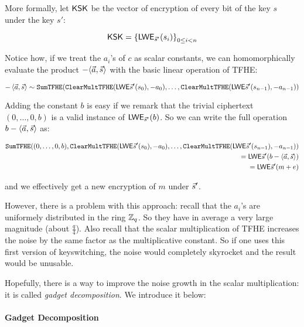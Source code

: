 More formally, let $\textsf{KSK}$ be the vector of encryption of every bit of the key $s$ under the key $s'$:

\[
	\textsf{KSK} = \left \{ \textsf{LWE}_{\vec s'}(s_i ) \right \}_{0 \le i < n}
\]

Notice how, if we treat the $a_i$'s of $c$ as scalar constants, we can homomorphically evaluate the product $- \langle \vec a ,\vec s \rangle$ with the basic linear operation of TFHE:


\begin{equation*}
	- \left\langle \vec a, \vec s \right\rangle \sim
	\texttt{SumTFHE}(
		\texttt{ClearMultTFHE}(\textsf{LWE}{\vec s'}(s_0), - a_0)
	, 
		\ldots
	, 
		\texttt{ClearMultTFHE}(\textsf{LWE}{\vec s'}(s_{n-1}), - a_{n-1})
	)
\end{equation*}

Adding the constant $b$ is easy if we remark that the trivial ciphertext $(0, \dots, 0, b)$ is a valid instance of $\textsf{LWE}_{\vec s'}(b)$. So we can write the full operation $b - \langle \vec a, \vec s \rangle$ as:

\begin{align*}
	\texttt{SumTFHE}((0, \dots, 0, b), 
		\texttt{ClearMultTFHE}(\textsf{LWE}{\vec s'}(s_0), - a_0)
	, 
		\ldots
	, 
		\texttt{ClearMultTFHE}(\textsf{LWE}{\vec s'}(s_{n-1}), - a_{n-1})
	)&\\
	 = \textsf{LWE}{\vec s'}(b - \langle \vec a, \vec s \rangle) &\\
	 = \textsf{LWE}{\vec s'}(m + e)
\end{align*}

and we effectively get a new encryption of $m$ under $\vec s'$.


However, there is a problem with this approach: recall that the $a_i$'s are uniformely distributed in the ring $\mathbb{Z}_q$. So they have in average a very large magnitude (about $\frac q 4$). Also recall that the scalar multiplication of TFHE increases the noise by the same factor as the multiplicative constant. So if one uses this first version of keyswitching, the noise would completely skyrocket and the result would be unusable.

Hopefully, there is a way to improve the noise growth in the scalar multiplication: it is called \textit{gadget decomposition}. We introduce it below:

\paragraph{Gadget Decomposition}

